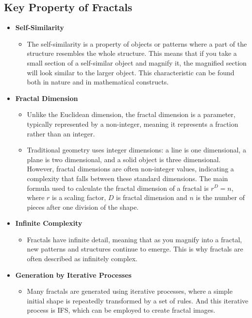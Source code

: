 \documentclass[a4paper,11pt, titlepage]{article}
\theoremstyle{definition}
\theoremstyle{plain}
\theoremstyle{remark}
\theoremstyle{definition}
\begin{document}
\subsection{Key Property of Fractals}
\begin{itemize}
    \item \textbf{Self-Similarity}
    \begin{itemize}
        \item The self-similarity is a property of objects or patterns where a part of the structure resembles the whole structure. This means that if you take a small section of a self-similar object and magnify it, the magnified section will look similar to the larger object. This characteristic can be found both in nature and in mathematical constructs.
    \end{itemize}
    \item \textbf{Fractal Dimension}
    \begin{itemize}
        \item Unlike the Euclidean dimension, the fractal dimension is a parameter, typically represented by a non-integer, meaning it represents a fraction rather than an integer.
        \item Traditional geometry uses integer dimensions: a line is one dimensional, a plane is two dimensional, and a solid object is three dimensional. However, fractal dimensions are often non-integer values, indicating a complexity that falls between these standard dimensions. The main formula used to calculate the fractal dimension of a fractal is $r^D = n$, where $r$ is a scaling factor, $D$ is fractal dimension and $n$ is the number of pieces after one division of the shape.
    \end{itemize}
    \item \textbf{Infinite Complexity}
    \begin{itemize}
        \item Fractals have infinite detail, meaning that as you magnify into a fractal, new patterns and structures continue to emerge. This is why fractals are often described as infinitely complex.
    \end{itemize}
    \item \textbf{Generation by Iterative Processes}
    \begin{itemize}
        \item Many fractals are generated using iterative processes, where a simple initial shape is repeatedly transformed by a set of rules. And this iterative process is IFS, which can be employed to create fractal images.
    \end{itemize}
    
\end{itemize}
\end{document}
